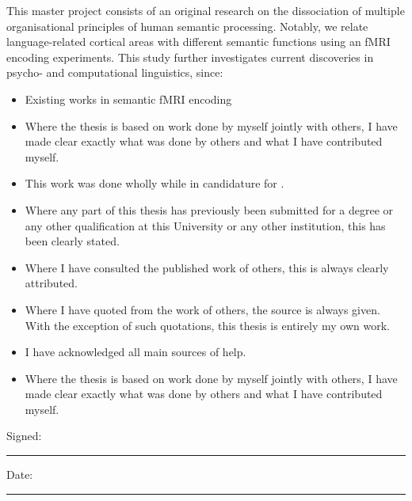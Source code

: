 \begin{declarationauthorship}
    \noindent This master project consists of an original research on the dissociation of multiple organisational principles of human semantic processing. Notably, we relate language-related cortical areas with different semantic functions using an fMRI encoding experiments. This study further investigates current discoveries in psycho- and computational linguistics, since:
    
    \begin{itemize}
    \item Existing works in semantic fMRI encoding %
    \item Where the thesis is based on work done by myself jointly with others, I have made clear exactly what was done by others and what I have contributed myself.\\
    \end{itemize}
        
    \begin{itemize} 
        \item This work was done wholly while in candidature for \degreename.
        \item Where any part of this thesis has previously been submitted for a degree or any other qualification at this University or any other institution, this has been clearly stated.
        \item Where I have consulted the published work of others, this is always clearly attributed.
        \item Where I have quoted from the work of others, the source is always given. With the exception of such quotations, this thesis is entirely my own work.
        \item I have acknowledged all main sources of help.
        \item Where the thesis is based on work done by myself jointly with others, I have made clear exactly what was done by others and what I have contributed myself.\\
        \end{itemize}
    
    \vspace[0.5em]
    \noindent Signed:\\
    \rule[0.5em]{25em}{0.5pt} %
        
    \noindent Date:\\
    \rule[0.5em]{25em}{0.5pt} %
    \end{declarationauthorship}
    
    \cleardoublepage